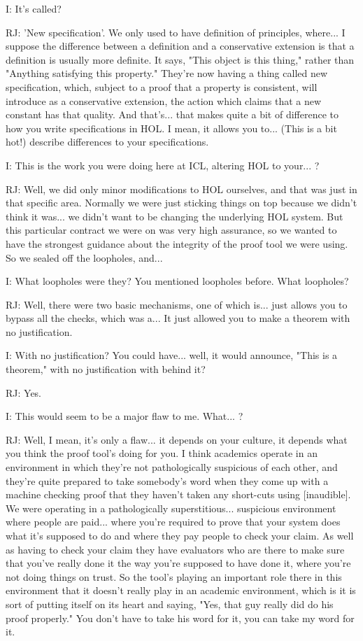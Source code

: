 \documentclass[10pt,titlepage]{book}
\begin{document}
I: It's called?

RJ: 'New specification'. We only used to have definition of principles, where... I suppose the difference between a definition and a conservative extension is that a definition is usually more definite. It says, "This object is this thing," rather than "Anything satisfying this property." They're now having a thing called new specification, which, subject to a proof that a property is consistent, will introduce as a conservative extension, the action which claims that a new constant has that quality. And that's... that makes quite a bit of difference to how you write specifications in HOL. I mean, it allows you to... (This is a bit hot!) describe differences to your specifications.

I: This is the work you were doing here at ICL, altering HOL to your... ?

RJ: Well, we did only minor modifications to HOL ourselves, and that was just in that specific area. Normally we were just sticking things on top because we didn't think it was... we didn't want to be changing the underlying HOL system. But this particular contract we were on was very high assurance, so we wanted to have the strongest guidance about the integrity of the proof tool we were using. So we sealed off the loopholes, and... 

I: What loopholes were they? You mentioned loopholes before. What loopholes?

RJ: Well, there were two basic mechanisms, one of which is... just allows you to bypass all the checks, which was a... It just allowed you to make a theorem with no justification.

I: With no justification? You could have... well, it would announce, "This is a theorem," with no justification with behind it?

RJ: Yes.

I: This would seem to be a major flaw to me. What... ?

RJ: Well, I mean, it's only a flaw... it depends on your culture, it depends what you think the proof tool's doing for you. I think academics operate in an environment in which they're not pathologically suspicious of each other, and they're quite prepared to take somebody's word when they come up with a machine checking proof that they haven't taken any short-cuts using [inaudible]. We were operating in a pathologically superstitious... suspicious environment where people are paid... where you're required to prove that your system does what it's supposed to do and where they pay people to check your claim. As well as having to check your claim they have evaluators who are there to make sure that you've really done it the way you're supposed to have done it, where you're not doing things on trust. So the tool's playing an important role there in this environment that it doesn't really play in an academic environment, which is it is sort of putting itself on its heart and saying, "Yes, that guy really did do his proof properly." You don't have to take his word for it, you can take my word for it.
\end{document}
